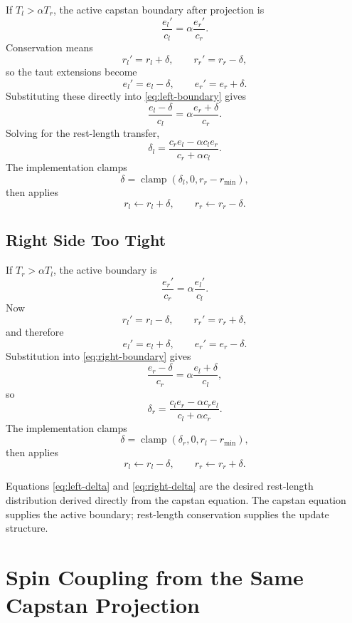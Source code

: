 \documentclass[11pt]{article}
\newcommand{\clamp}{\operatorname{clamp}}
\begin{document}
If $T_l>\alpha T_r$, the active capstan boundary after projection is
\begin{equation}
  \frac{e_l'}{c_l} = \alpha \frac{e_r'}{c_r}.
  \label{eq:left-boundary}
\end{equation}
Conservation means
\[
  r_l'=r_l+\delta,\qquad r_r'=r_r-\delta,
\]
so the taut extensions become
\[
  e_l'=e_l-\delta,\qquad e_r'=e_r+\delta.
\]
Substituting these directly into \eqref{eq:left-boundary} gives
\[
  \frac{e_l-\delta}{c_l}
  =
  \alpha\frac{e_r+\delta}{c_r}.
\]
Solving for the rest-length transfer,
\begin{equation}
  \delta_l =
  \frac{c_r e_l-\alpha c_l e_r}{c_r+\alpha c_l}.
  \label{eq:left-delta}
\end{equation}
The implementation clamps
\[
  \delta=\clamp(\delta_l,0,r_r-r_\mathrm{min}),
\]
then applies
\[
  r_l\leftarrow r_l+\delta,\qquad
  r_r\leftarrow r_r-\delta.
\]

\subsection{Right Side Too Tight}

If $T_r>\alpha T_l$, the active boundary is
\begin{equation}
  \frac{e_r'}{c_r} = \alpha \frac{e_l'}{c_l}.
  \label{eq:right-boundary}
\end{equation}
Now
\[
  r_l'=r_l-\delta,\qquad r_r'=r_r+\delta,
\]
and therefore
\[
  e_l'=e_l+\delta,\qquad e_r'=e_r-\delta.
\]
Substitution into \eqref{eq:right-boundary} gives
\[
  \frac{e_r-\delta}{c_r}
  =
  \alpha\frac{e_l+\delta}{c_l},
\]
so
\begin{equation}
  \delta_r =
  \frac{c_l e_r-\alpha c_r e_l}{c_l+\alpha c_r}.
  \label{eq:right-delta}
\end{equation}
The implementation clamps
\[
  \delta=\clamp(\delta_r,0,r_l-r_\mathrm{min}),
\]
then applies
\[
  r_l\leftarrow r_l-\delta,\qquad
  r_r\leftarrow r_r+\delta.
\]

Equations \eqref{eq:left-delta} and \eqref{eq:right-delta} are the desired
rest-length distribution derived directly from the capstan equation.  The
capstan equation supplies the active boundary; rest-length conservation supplies
the update structure.

\section{Spin Coupling from the Same Capstan Projection}
\end{document}

